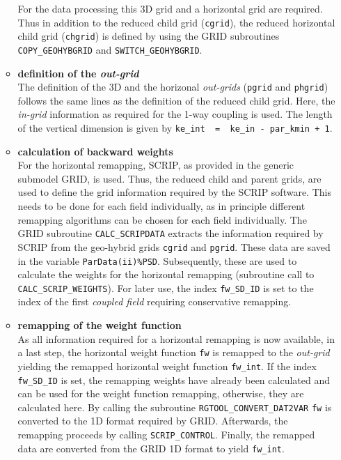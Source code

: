 \documentclass[11pt,twoside]{article}
\begin{document}
\begin{enumerate}
\begin{itemize}
For the data processing this 3D grid and a 
horizontal grid are required. Thus in addition to the reduced child
grid (\verb|cgrid|), the reduced horizontal child grid (\verb|chgrid|) is
defined by using the GRID subroutines \verb|COPY_GEOHYBGRID| and 
\verb|SWITCH_GEOHYBGRID|.                 
\item {\bf definition of the {\it out-grid}}\\
The definition of the 3D and the horizonal {\it out-grids} (\verb|pgrid| and
\verb|phgrid|) follows the same lines as the definition of the reduced child
grid. Here, the {\it in-grid} information as required for the 1-way coupling 
is used. The length of the vertical dimension is given by 
\verb|ke_int  =  ke_in - par_kmin + 1|.
\item{\bf calculation of backward weights}\\
For the horizontal remapping, SCRIP, as provided in the generic submodel
 GRID, is used. Thus, the reduced child and parent grids, are used to
define the grid information required by the SCRIP software. This needs to be
 done for each field individually, as in principle different remapping
 algorithms can be chosen for each field individually. 
The GRID subroutine \verb|CALC_SCRIPDATA| extracts the information required
by SCRIP from the geo-hybrid grids \verb|cgrid| and \verb|pgrid|.
These data are saved in the variable \verb|ParData(ii)%PSD|.
Subsequently, these are used to calculate the weights for the horizontal
 remapping (subroutine call to \verb|CALC_SCRIP_WEIGHTS|).
For later use, the index \verb|fw_SD_ID| is set to the index of the first
{\it coupled field} requiring conservative remapping. 
\item{\bf remapping of the weight function}\\
As all information required for a horizontal remapping is now available, 
in a last step, the horizontal weight function \verb|fw| is remapped to
the {\it out-grid} yielding the remapped horizontal weight
function \verb|fw_int|. 
If the index \verb|fw_SD_ID| is set, the remapping weights have already been
calculated and can be used for the weight function remapping, otherwise,
they are calculated here.
By calling the subroutine \verb|RGTOOL_CONVERT_DAT2VAR| \verb|fw| is converted
to the 1D format required by GRID. Afterwards, the remapping proceeds by
calling \verb|SCRIP_CONTROL|. Finally, the remapped data are converted from the
GRID 1D format to yield \verb|fw_int|.
\end{itemize}



\end{enumerate}
\end{document}
